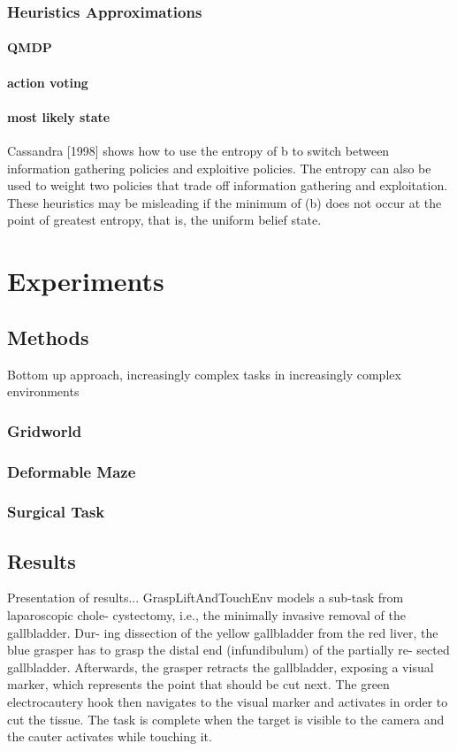 \documentclass[a4paper,11pt]{report}
\theoremstyle{definition}
\theoremstyle{plain}
\theoremstyle{remark}  %
\begin{document}
\section{Heuristics Approximations}
\subsection{QMDP}
\subsection{action voting}
\subsection{most likely state}
Cassandra [1998] shows how to use the entropy
of b to switch between information gathering policies and exploitive policies.
The entropy can also be used to weight two policies that trade off information
gathering and exploitation. These heuristics may be misleading if the minimum
of (b) does not occur at the point of greatest entropy, that is, the uniform
belief state.


\part{Experiments}

\chapter{Methods}
Bottom up approach, increasingly complex tasks in increasingly complex environments
\section{Gridworld}
\section{Deformable Maze}
\section{Surgical Task}

\chapter{Results}
Presentation of results...
GraspLiftAndTouchEnv models a sub-task from laparoscopic chole-
cystectomy, i.e., the minimally invasive removal of the gallbladder. Dur-
ing dissection of the yellow gallbladder from the red liver, the blue
grasper has to grasp the distal end (infundibulum) of the partially re-
sected gallbladder. Afterwards, the grasper retracts the gallbladder,
exposing a visual marker, which represents the point that should be
cut next. The green electrocautery hook then navigates to the visual
marker and activates in order to cut the tissue. The task is complete
when the target is visible to the camera and the cauter activates while
touching it.
\end{document}
